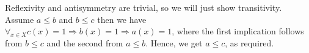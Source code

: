 Reflexivity and antisymmetry are trivial, so we will just show transitivity. Assume \(a\leq b\) and \(b \leq c\) then we have \(\forall_{x\in X} c(x) = 1 \Rightarrow b(x) = 1 \Rightarrow a(x) = 1\), where the first implication follows from \(b \leq c\) and the second from \(a\leq b\). Hence, we get \(a\leq c\), as required. 
